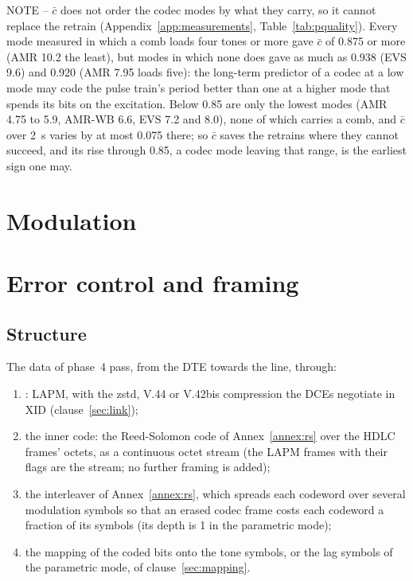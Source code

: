\documentclass[a4paper,11pt]{article}
\newcounter{annex}
\newcommand{\itunote}[1]{\par{\small NOTE -- #1}\par}
\newcommand{\rec}[1]{[ITU-T #1]}
\begin{document}
\itunote{$\bar c$ does not order the codec modes by what they carry, so it
cannot replace the retrain (Appendix~\ref{app:measurements},
Table~\ref{tab:pquality}).  Every mode measured in which a comb loads
four tones or more gave $\bar c$ of 0.875 or more (AMR 10.2 the least),
but modes in which none does gave as much as 0.938 (EVS 9.6) and 0.920
(AMR 7.95 loads five): the long-term predictor of a codec at a low mode
may code the pulse train's period better than one at a higher mode that
spends its bits on the excitation.  Below 0.85 are only the lowest modes
(AMR 4.75 to 5.9, AMR-WB 6.6, EVS 7.2 and 8.0), none of which carries a
comb, and $\bar c$ over 2~s varies by at most 0.075 there; so $\bar c$
saves the retrains where they cannot succeed, and its rise through 0.85,
a codec mode leaving that range, is the earliest sign one may.}

\section{Modulation}\label{sec:modulation}


\section{Error control and framing}\label{sec:error}
\subsection{Structure}
The data of phase~4 pass, from the DTE towards the line, through:
\begin{enumerate}
\item \rec{V.42}: LAPM, with the zstd, V.44 or V.42bis compression the
  DCEs negotiate in XID (clause~\ref{sec:link});
\item the inner code: the Reed-Solomon code of Annex~\ref{annex:rs} over
  the HDLC frames' octets, as a continuous octet stream (the LAPM frames
  with their flags are the stream; no further framing is added);
\item the interleaver of Annex~\ref{annex:rs}, which spreads each
  codeword over several modulation symbols so that an erased codec frame
  costs each codeword a fraction of its symbols (its depth is 1 in the
  parametric mode);
\item the mapping of the coded bits onto the tone symbols, or the lag
  symbols of the parametric mode, of clause~\ref{sec:mapping}.
\end{enumerate}
\end{document}
